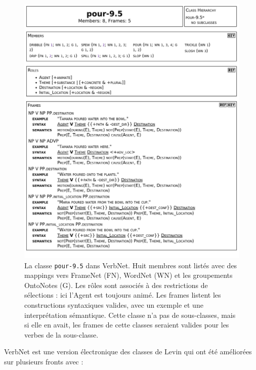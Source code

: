 \begin{figure}[p]
    \centering
    \includegraphics[width=\textwidth]{fig/verbnet_pour_class.png}
    \caption{\label{fig:exemple_verbnet}La classe \texttt{pour-9.5} dans
    VerbNet. Huit membres sont listés avec des mappings vers FrameNet (FN),
    WordNet (WN) et les groupements OntoNotes (G). Les rôles sont associés à
    des restrictions de sélections : ici l'Agent est toujours animé. Les frames
    listent les constructions syntaxiques valides, avec un exemple et une
    interprétation sémantique. Cette classe n'a pas de sous-classes, mais si
    elle en avait, les frames de cette classes seraient valides pour les verbes
    de la sous-classe.}
\end{figure}

VerbNet \citep{kipperschuler2005verbnet} est une version électronique des
classes de Levin qui ont été améliorées sur plusieurs fronts avec :

